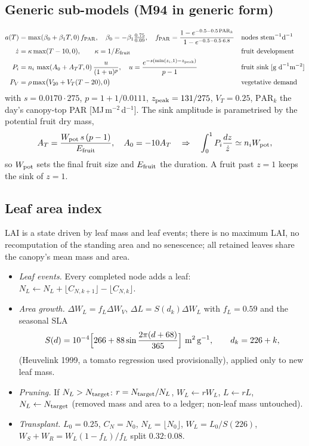 \subsection{Generic sub-models (M94 in generic form)}
\begin{align}
a(T)&=\max(\beta_0+\beta_1T,0)\,f_{\rm PAR},\quad \beta_0=-\beta_1\tfrac{0.75}{0.09},\quad
f_{\rm PAR}=\frac{1-e^{-0.5-0.5\,\mathrm{PAR}_k}}{1-e^{-0.5-0.5\cdot6.8}} &&\text{nodes stem}^{-1}\text{d}^{-1}\\
\dot z&=\kappa\max(T-10,0),\qquad \kappa=1/E_{\rm fruit} &&\text{fruit development}\\
P_i&=n_i\,\max(A_0+A_TT,0)\,\frac{u}{(1+u)^p},\quad u=\frac{e^{-s(\min(z_i,1)-z_{\rm peak})}}{p-1} &&\text{fruit sink [g d}^{-1}\text{m}^{-2}]\\
P_V&=\rho\max\bigl(V_{20}+V_T(T-20),0\bigr) &&\text{vegetative demand}
\end{align}
with $s=0.0170\cdot275$, $p=1+1/0.0111$, $z_{\rm peak}=131/275$, $V_T=0.25$, $\mathrm{PAR}_k$ the day's canopy-top PAR
[MJ\,m$^{-2}$\,d$^{-1}$]. The sink amplitude is parametrised by the potential fruit dry mass,
\begin{equation}
A_T=\frac{W_{\rm pot}\,s\,(p-1)}{E_{\rm fruit}},\quad A_0=-10A_T\quad\Rightarrow\quad\int_0^1P_i\frac{dz}{\dot z}\simeq n_iW_{\rm pot},
\end{equation}
so $W_{\rm pot}$ sets the final fruit size and $E_{\rm fruit}$ the duration. A fruit past $z=1$ keeps the sink of $z=1$.

\subsection{Leaf area index}\label{sec:lai}
LAI is a state driven by leaf mass and leaf events; there is no maximum LAI, no recomputation of the standing area and no
senescence; all retained leaves share the canopy's mean mass and area.
\begin{itemize}[nosep]
\item \emph{Leaf events.} Every completed node adds a leaf: $N_L\leftarrow N_L+\lfloor C_{N,k+1}\rfloor-\lfloor C_{N,k}\rfloor$.
\item \emph{Area growth.} $\Delta W_L=f_L\Delta W_V$, $\Delta L=S(d_k)\Delta W_L$ with $f_L=0.59$ and the seasonal SLA
\begin{equation}
S(d)=10^{-4}\Bigl[266+88\sin\frac{2\pi(d+68)}{365}\Bigr]\ \text{m}^2\,\text{g}^{-1},\qquad d_k=226+k,
\end{equation}
(Heuvelink 1999, a tomato regression used provisionally), applied only to new leaf mass.
\item \emph{Pruning.} If $N_L>N_{\rm target}$: $r=N_{\rm target}/N_L$, $W_L\leftarrow rW_L$, $L\leftarrow rL$,
$N_L\leftarrow N_{\rm target}$ (removed mass and area to a ledger; non-leaf mass untouched).
\item \emph{Transplant.} $L_0=0.25$, $C_N=N_0$, $N_L=\lfloor N_0\rfloor$, $W_L=L_0/S(226)$, $W_S+W_R=W_L(1-f_L)/f_L$ split $0.32:0.08$.
\end{itemize}

